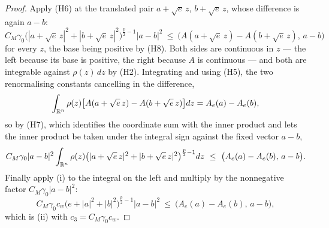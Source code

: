 \begin{proof}
Apply (H6) at the translated pair $a+\sqrt e\,z$, $b+\sqrt e\,z$, whose
difference is again $a-b$:
\[
C_M\gamma_0\bigl(|a+\sqrt e\,z|^2+|b+\sqrt e\,z|^2\bigr)^{\frac p2-1}|a-b|^2
\ \le\ \bigl(A(a+\sqrt e\,z)-A(b+\sqrt e\,z),\,a-b\bigr)
\]
for every $z$, the base being positive by (H8).  Both sides are continuous in
$z$ --- the left because its base is positive, the right because $A$ is
continuous --- and both are integrable against $\rho(z)\,dz$ by (H2).
Integrating and using (H5), the two renormalising constants cancelling in the
difference,
\[
\int_{\mathbb{R}^n}\rho(z)\bigl[A(a+\sqrt e\,z)-A(b+\sqrt e\,z)\bigr]dz
=A_e(a)-A_e(b),
\]
so by (H7), which identifies the coordinate sum with the inner product and lets
the inner product be taken under the integral sign against the fixed vector
$a-b$,
\[
C_M\gamma_0|a-b|^2\int_{\mathbb{R}^n}\rho(z)
\bigl(|a+\sqrt e\,z|^2+|b+\sqrt e\,z|^2\bigr)^{\frac p2-1}dz
\ \le\ \bigl(A_e(a)-A_e(b),\,a-b\bigr).
\]
Finally apply (i) to the integral on the left and multiply by the nonnegative
factor $C_M\gamma_0|a-b|^2$:
\[
C_M\gamma_0c_w\bigl(e+|a|^2+|b|^2\bigr)^{\frac p2-1}|a-b|^2
\ \le\ \bigl(A_e(a)-A_e(b),\,a-b\bigr),
\]
which is (ii) with $c_3=C_M\gamma_0c_w$.
\end{proof}
